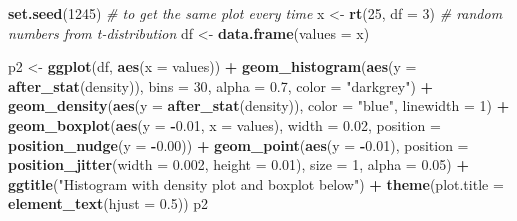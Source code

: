 \documentclass[
]{book}
\newenvironment{Shaded}{\begin{snugshade}}{\end{snugshade}}
\newcommand{\AttributeTok}[1]{\textcolor[rgb]{0.13,0.29,0.53}{#1}}
\newcommand{\CommentTok}[1]{\textcolor[rgb]{0.56,0.35,0.01}{\textit{#1}}}
\newcommand{\DecValTok}[1]{\textcolor[rgb]{0.00,0.00,0.81}{#1}}
\newcommand{\FloatTok}[1]{\textcolor[rgb]{0.00,0.00,0.81}{#1}}
\newcommand{\FunctionTok}[1]{\textcolor[rgb]{0.13,0.29,0.53}{\textbf{#1}}}
\newcommand{\NormalTok}[1]{#1}
\newcommand{\OtherTok}[1]{\textcolor[rgb]{0.56,0.35,0.01}{#1}}
\newcommand{\SpecialCharTok}[1]{\textcolor[rgb]{0.81,0.36,0.00}{\textbf{#1}}}
\newcommand{\StringTok}[1]{\textcolor[rgb]{0.31,0.60,0.02}{#1}}
\begin{document}
\begin{Shaded}
\begin{Highlighting}[]
\FunctionTok{set.seed}\NormalTok{(}\DecValTok{1245}\NormalTok{) }\CommentTok{\# to get the same plot every time}
\NormalTok{x }\OtherTok{\textless{}{-}} \FunctionTok{rt}\NormalTok{(}\DecValTok{25}\NormalTok{, }\AttributeTok{df =} \DecValTok{3}\NormalTok{) }\CommentTok{\# random numbers from t{-}distribution}
\NormalTok{df }\OtherTok{\textless{}{-}} \FunctionTok{data.frame}\NormalTok{(}\AttributeTok{values =}\NormalTok{ x)}

\NormalTok{p2 }\OtherTok{\textless{}{-}} \FunctionTok{ggplot}\NormalTok{(df, }\FunctionTok{aes}\NormalTok{(}\AttributeTok{x =}\NormalTok{ values)) }\SpecialCharTok{+}
  \FunctionTok{geom\_histogram}\NormalTok{(}\FunctionTok{aes}\NormalTok{(}\AttributeTok{y =} \FunctionTok{after\_stat}\NormalTok{(density)),}
                 \AttributeTok{bins =} \DecValTok{30}\NormalTok{, }\AttributeTok{alpha =} \FloatTok{0.7}\NormalTok{, }\AttributeTok{color =} \StringTok{"darkgrey"}\NormalTok{) }\SpecialCharTok{+}
  \FunctionTok{geom\_density}\NormalTok{(}\FunctionTok{aes}\NormalTok{(}\AttributeTok{y =} \FunctionTok{after\_stat}\NormalTok{(density)), }\AttributeTok{color =} \StringTok{"blue"}\NormalTok{, }\AttributeTok{linewidth =} \DecValTok{1}\NormalTok{) }\SpecialCharTok{+}
  \FunctionTok{geom\_boxplot}\NormalTok{(}\FunctionTok{aes}\NormalTok{(}\AttributeTok{y =} \SpecialCharTok{{-}}\FloatTok{0.01}\NormalTok{, }\AttributeTok{x =}\NormalTok{ values), }\AttributeTok{width =} \FloatTok{0.02}\NormalTok{,}
               \AttributeTok{position =} \FunctionTok{position\_nudge}\NormalTok{(}\AttributeTok{y =} \SpecialCharTok{{-}}\FloatTok{0.00}\NormalTok{)) }\SpecialCharTok{+}
  \FunctionTok{geom\_point}\NormalTok{(}\FunctionTok{aes}\NormalTok{(}\AttributeTok{y =} \SpecialCharTok{{-}}\FloatTok{0.01}\NormalTok{),}
             \AttributeTok{position =} \FunctionTok{position\_jitter}\NormalTok{(}\AttributeTok{width =} \FloatTok{0.002}\NormalTok{, }\AttributeTok{height =} \FloatTok{0.01}\NormalTok{),}
             \AttributeTok{size =} \DecValTok{1}\NormalTok{, }\AttributeTok{alpha =} \FloatTok{0.05}\NormalTok{) }\SpecialCharTok{+}
  \FunctionTok{ggtitle}\NormalTok{(}\StringTok{"Histogram with density plot and boxplot below"}\NormalTok{) }\SpecialCharTok{+}
  \FunctionTok{theme}\NormalTok{(}\AttributeTok{plot.title =} \FunctionTok{element\_text}\NormalTok{(}\AttributeTok{hjust =} \FloatTok{0.5}\NormalTok{))}
\NormalTok{p2}
\end{Highlighting}
\end{Shaded}
\end{document}
